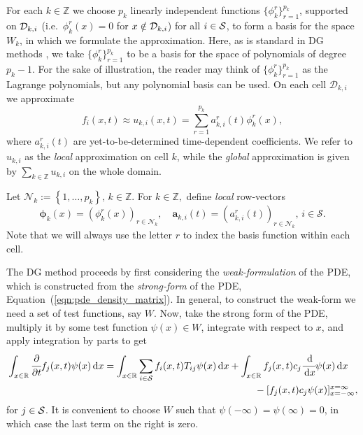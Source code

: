 For each \(k\in \mathbb Z\) we choose \(p_k\) linearly independent functions \(\{\phi^r_k\}_{r=1}^{p_k}\), supported on \(\mathcal{D}_{k,i}\) (i.e.~\(\phi^r_k(x)=0\) for \(x\notin\mathcal{D}_{k,i}\)) for all \(i\in\mathcal{S}\), to form a basis for the space \(W_k\), in which we formulate the approximation. Here, as is standard in DG methods \citep{nodalDGBook}, we take \(\{\phi^r_k\}_{r=1}^{p_k}\) to be a basis for the space of polynomials of degree \(p_k-1\). For the sake of illustration, the reader may think of \(\{\phi^r_k\}_{r=1}^{p_k}\) as the Lagrange polynomials, but any polynomial basis can be used. On each cell \(\mathcal D_{k,i}\) we approximate 
\[f_i(x,t)\approx u_{k,i}(x,t)=\sum\limits_{r=1}^{p_k}a_{k,i}^r(t)\phi^r_k(x),\] 
where \(a_{k,i}^r(t)\) are yet-to-be-determined time-dependent coefficients. We refer to \(u_{k,i}\) as the \textit{local} approximation on cell \(k\), while the \textit{global} approximation is given by \(\sum\limits_{k\in\mathbb Z}u_{k,i}\) on the whole domain. %

Let \(\mathcal N_k := \left\{1,\dots,p_k\right\},\, k \in \mathbb Z\). For \(k\in\mathbb Z,\) define \textit{local} row-vectors 
\[\boldsymbol \phi_k(x) = (\phi^r_k(x))_{r\in\mathcal N_k}, \quad \boldsymbol a_{k,i}(t) = (a_{k,i}^r(t))_{r\in\mathcal N_k},\,i\in\mathcal S.\]
Note that we will always use the letter \(r\) to index the basis function within each cell.

The DG method proceeds by first considering the \textit{weak-formulation} of the PDE, which is constructed from the \textit{strong-form} of the PDE, Equation~(\ref{eqn:pde_density_matrix}). In general, to construct the weak-form we need a set of test functions, say \(W\). Now, take the strong form of the PDE, multiply it by some test function \(\psi(x)\in W\), integrate with respect to \(x\), and apply integration by parts to get 
\begin{align}
\begin{multlined}[t]
	\int_{x\in\mathbb R}\cfrac{\partial}{\partial t} f_j(x,t)\psi(x)\wrt x = \int_{x\in\mathbb R} \sum_{i\in\calS}f_i(x,t)T_{ij}\psi(x)\wrt x 
	+  \int_{x\in\mathbb R} f_j(x,t)c_j\cfrac{\wrt}{\wrt x}\psi(x)\wrt x \\{}- [ f_j(x,t)c_j\psi(x)]_{x=-\infty}^{x=\infty}, \end{multlined}\label{eqn:weak form}
\end{align}
for \(j\in\mathcal{S}\). It is convenient to choose \(W\) such that \(\psi(-\infty)=\psi(\infty)=0\), in which case the last term on the right is zero. %

